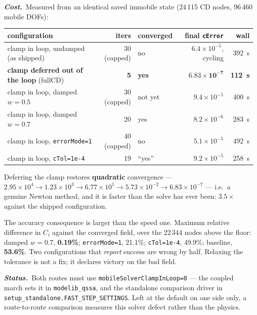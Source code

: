 \documentclass[11pt,a4paper]{article}
\newcommand{\code}[1]{\texttt{\small #1}}
\newcommand{\cost}[1]{\par\noindent\textbf{\itshape Cost.}\ #1\par}
\newcommand{\status}[1]{\par\noindent\textbf{\itshape Status.}\ #1\par}
\begin{document}
\cost{Measured from an identical saved immobile state (24\,115 CD nodes,
96\,460 mobile DOFs):

\begin{center}
\small
\begin{tabular}{@{}lrlrr@{}}
\toprule
configuration & iters & converged & final \code{cError} & wall \\
\midrule
clamp in loop, undamped (as shipped) & 30 (capped) & no  & $6.4\times10^{-5}$, cycling & 392~s \\
\textbf{clamp deferred out of the loop} (fullCD) & \textbf{5} & \textbf{yes} & $\mathbf{6.83\times10^{-7}}$ & \textbf{112~s} \\
clamp in loop, damped $w=0.5$ & 30 (capped) & not yet & $9.4\times10^{-5}$ & 400~s \\
clamp in loop, damped $w=0.7$ & 20 & yes & $8.2\times10^{-6}$ & 283~s \\
clamp in loop, \code{errorMode=1} & 40 (capped) & no & $5.1\times10^{-5}$ & 492~s \\
clamp in loop, \code{cTol=1e-4} & 19 & ``yes'' & $9.2\times10^{-5}$ & 258~s \\
\bottomrule
\end{tabular}
\end{center}

\noindent
Deferring the clamp restores \textbf{quadratic} convergence ---
$2.95\times10^{4} \rightarrow 1.23\times10^{3} \rightarrow 6.77\times10^{1}
\rightarrow 5.73\times10^{-2} \rightarrow 6.83\times10^{-7}$ --- i.e.\ a
genuine Newton method, and it is faster than the solve has ever been:
$3.5\times$ against the shipped configuration.

The accuracy consequence is larger than the speed one. Maximum relative
difference in $C_i$ against the converged field, over the 22\,344 nodes above
the floor: damped $w=0.7$, \textbf{0.19\%}; \code{errorMode=1}, 21.1\%;
\code{cTol=1e-4}, 49.9\%; baseline, \textbf{53.6\%}. Two configurations that
\emph{report} success are wrong by half. Relaxing the tolerance is not a fix;
it declares victory on the bad field.}
\status{Both routes must use \code{mobileSolverClampInLoop=0} --- the coupled
march sets it in \code{modelib\_qssa}, and the standalone comparison driver in
\code{setup\_standalone.\allowbreak FAST\_STEP\_SETTINGS}. Left at the default on one side
only, a route-to-route comparison measures this solver defect rather than the
physics.}
\end{document}
